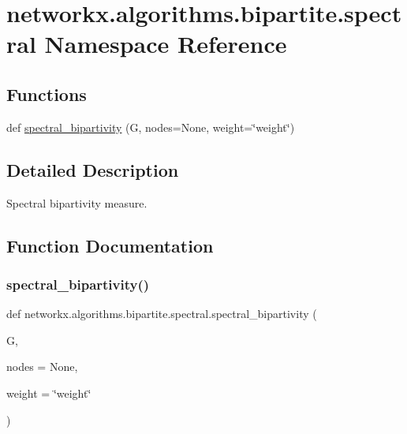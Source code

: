 \hypertarget{namespacenetworkx_1_1algorithms_1_1bipartite_1_1spectral}{}\section{networkx.\+algorithms.\+bipartite.\+spectral Namespace Reference}
\label{namespacenetworkx_1_1algorithms_1_1bipartite_1_1spectral}
\subsection*{Functions}
\begin{DoxyCompactItemize}
\item 
def \hyperlink{namespacenetworkx_1_1algorithms_1_1bipartite_1_1spectral_a6b9856eccf3865f255762bd3d132a85d}{spectral\+\_\+bipartivity} (G, nodes=None, weight=\char`\"{}weight\char`\"{})
\end{DoxyCompactItemize}


\subsection{Detailed Description}
\begin{DoxyVerb}Spectral bipartivity measure.
\end{DoxyVerb}
 

\subsection{Function Documentation}
\mbox{\label{namespacenetworkx_1_1algorithms_1_1bipartite_1_1spectral_a6b9856eccf3865f255762bd3d132a85d}} 
\subsubsection{\texorpdfstring{spectral\+\_\+bipartivity()}{spectral\_bipartivity()}}
{\footnotesize\ttfamily def networkx.\+algorithms.\+bipartite.\+spectral.\+spectral\+\_\+bipartivity (\begin{DoxyParamCaption}\item[{}]{G,  }\item[{}]{nodes = {\ttfamily None},  }\item[{}]{weight = {\ttfamily \char`\"{}weight\char`\"{}} }\end{DoxyParamCaption})}


